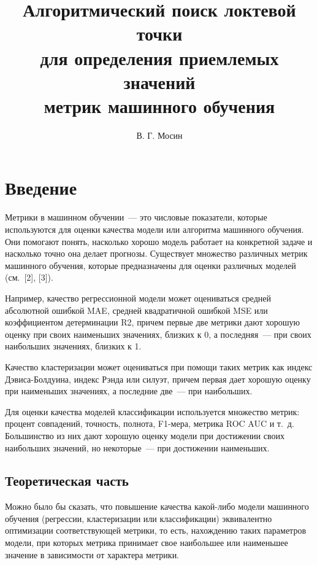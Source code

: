 \documentclass[a4paper,12pt]{article}
\title{Алгоритмический поиск локтевой точки\\	для определения приемлемых значений\\ метрик машинного обучения }
\author{В. Г. Мосин}
\date{}
\begin{document}
	\maketitle
	
\tableofcontents
	
\section{Введение}
Метрики в машинном обучении — это числовые показатели, которые используются для оценки качества модели или алгоритма машинного обучения. Они помогают понять, насколько хорошо модель работает на конкретной задаче и насколько точно она делает прогнозы. Существует множество различных метрик машинного обучения, которые предназначены для оценки различных моделей (см. [2], [3]).

Например, качество регрессионной модели может оцениваться средней абсолютной ошибкой MAE, средней квадратичной ошибкой MSE или коэффициентом детерминации R2, причем первые две метрики дают хорошую оценку при своих наименьших значениях, близких к 0, а последняя — при своих наибольших значениях, близких к 1. 

Качество кластеризации может оцениваться при помощи таких метрик как индекс Дэвиса-Болдуина,  индекс Рэнда или силуэт, причем первая дает хорошую оценку при наименьших значениях, а последние две — при наибольших. 

Для оценки качества моделей классификации используется множество метрик: процент совпадений, точность, полнота, F1-мера, метрика ROC AUC и т. д. Большинство из них дают хорошую оценку модели при достижении своих наибольших значений, но некоторые — при достижении наименьших.


\subsection{Теоретическая часть}

Можно было бы сказать, что повышение качества какой-либо модели машинного обучения (регрессии, кластеризации или классификации) эквивалентно оптимизации соответствующей метрики, то есть, нахождению таких параметров модели, при которых метрика принимает свое наибольшее или наименьшее значение в зависимости от характера метрики. 
\end{document}

